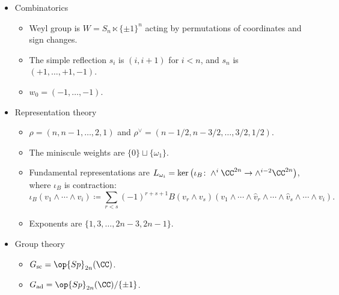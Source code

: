 \documentclass{article}
\begin{document}
\begin{itemize}
\begin{itemize}
		\item The simple roots are $\{e_i-e_{i+1}:i\}\cup\{2e_n\}$. Set $\alpha_i\coloneqq e_i-e_{i+1}$ and $\alpha_n\coloneqq2e_n$.
		\item Dynkin diagram:
		\[\begin{tikzcd}[cramped]
			{\alpha_1} & {\alpha_2} & \cdots & {\alpha_{n-1}} & {\alpha_n}
			\arrow[no head, from=1-1, to=1-2]
			\arrow[no head, from=1-2, to=1-3]
			\arrow[no head, from=1-3, to=1-4]
			\arrow[Rightarrow, nfold, from=1-5, to=1-4]
		\end{tikzcd}\]
		\item The fundamental weights are $\{\omega_i\}_i$ where $\omega_i\coloneqq({1,\ldots,1},0,\ldots,0)$ has $i$ ones.
		\item Maximal root $\theta=2e_1$.
	\end{itemize}
	\item Combinatorics
	\begin{itemize}
		\item Weyl group is $W=S_{n}\ltimes\{\pm1\}^n$ acting by permutations of coordinates and sign changes.
		\item The simple reflection $s_i$ is $(i,i+1)$ for $i<n$, and $s_n$ is $(+1,\ldots,+1,-1)$.
		\item $w_0=(-1,\ldots,-1)$.
	\end{itemize}
	\item Representation theory
	\begin{itemize}
		\item $\rho=(n,n-1,\ldots,2,1)$ and $\rho^\lor=(n-1/2,n-3/2,\ldots,3/2,1/2)$.
		\item The miniscule weights are $\{0\}\sqcup\{\omega_1\}$.
		\item Fundamental representations are $L_{\omega_i}=\ker\left(\iota_B\colon\land^i\CC^{2n}\to\land^{i-2}\CC^{2n}\right)$, where $\iota_B$ is contraction:
		\[\iota_B(v_1\land\cdots\land v_i)\coloneqq\sum_{r<s}(-1)^{r+s+1}B(v_r\land v_s)(v_1\land\cdots\land\widehat v_r\land\cdots\land\widehat v_s\land\cdots\land v_i).\]
		\item Exponents are $\{1,3,\ldots,2n-3,2n-1\}$.
	\end{itemize}
	\item Group theory
	\begin{itemize}
		\item $G_{\mathrm{sc}}=\op{Sp}_{2n}(\CC)$.
		\item $G_{\mathrm{ad}}=\op{Sp}_{2n}(\CC)/\{\pm1\}$.
	\end{itemize}
\end{itemize}
\end{document}

